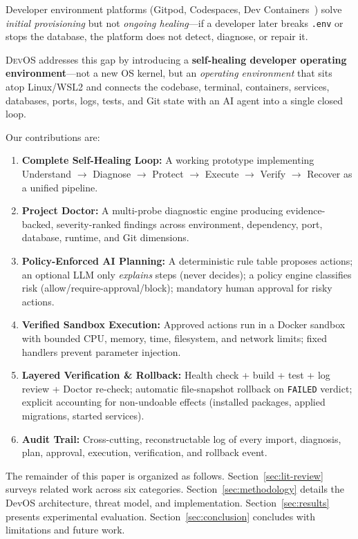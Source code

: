 \documentclass[conference,10pt,caption=false]{IEEEtran}
\newcommand{\devos}{\textsc{DevOS}\xspace}
\begin{document}
Developer environment platforms (Gitpod, Codespaces, Dev Containers~\cite{devcontainers2026}) solve \textit{initial provisioning} but not \textit{ongoing healing}---if a developer later breaks \texttt{.env} or stops the database, the platform does not detect, diagnose, or repair it.

\devos addresses this gap by introducing a \textbf{self-healing developer operating environment}---not a new OS kernel, but an \textit{operating environment} that sits atop Linux/WSL2 and connects the codebase, terminal, containers, services, databases, ports, logs, tests, and Git state with an AI agent into a single closed loop.

Our contributions are:
\begin{enumerate}[leftmargin=*, nosep]
    \item \textbf{Complete Self-Healing Loop:} A working prototype implementing Understand $\to$ Diagnose $\to$ Protect $\to$ Execute $\to$ Verify $\to$ Recover as a unified pipeline.
    \item \textbf{Project Doctor:} A multi-probe diagnostic engine producing evidence-backed, severity-ranked findings across environment, dependency, port, database, runtime, and Git dimensions.
    \item \textbf{Policy-Enforced AI Planning:} A deterministic rule table proposes actions; an optional LLM only \textit{explains} steps (never decides); a policy engine classifies risk (allow/require-approval/block); mandatory human approval for risky actions.
    \item \textbf{Verified Sandbox Execution:} Approved actions run in a Docker sandbox with bounded CPU, memory, time, filesystem, and network limits; fixed handlers prevent parameter injection.
    \item \textbf{Layered Verification \& Rollback:} Health check + build + test + log review + Doctor re-check; automatic file-snapshot rollback on \texttt{FAILED} verdict; explicit accounting for non-undoable effects (installed packages, applied migrations, started services).
    \item \textbf{Audit Trail:} Cross-cutting, reconstructable log of every import, diagnosis, plan, approval, execution, verification, and rollback event.
\end{enumerate}

The remainder of this paper is organized as follows. Section~\ref{sec:lit-review} surveys related work across six categories. Section~\ref{sec:methodology} details the DevOS architecture, threat model, and implementation. Section~\ref{sec:results} presents experimental evaluation. Section~\ref{sec:conclusion} concludes with limitations and future work.
\end{document}
